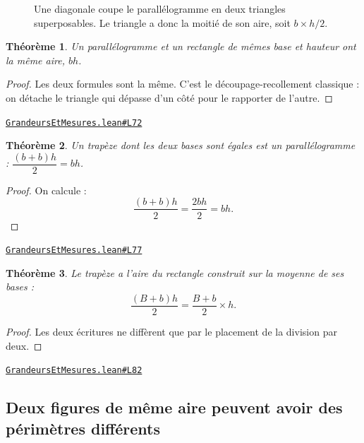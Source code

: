\documentclass[11pt,a4paper]{article}
\theoremstyle{definition}
\theoremstyle{plain}
\newtheorem{theoreme}{Théorème}
\newcommand{\source}[2]{\par\smallskip\noindent\hfill{\footnotesize\href{#1}{\texttt{#2}}}\par\smallskip}
\begin{document}
\begin{figure}[h]
\centering

\caption{Une diagonale coupe le parallélogramme en deux triangles superposables. Le triangle a donc la moitié de son aire, soit $b \times h / 2$.}
\end{figure}

\begin{theoreme}
Un parallélogramme et un rectangle de mêmes base et hauteur ont la même aire, $bh$.
\end{theoreme}

\begin{proof}
Les deux formules sont la même. C'est le découpage-recollement classique : on détache le
triangle qui dépasse d'un côté pour le rapporter de l'autre.
\end{proof}
\source{https://github.com/Commutator-IO/learn-lean/blob/main/courses/01-college/04-grandeurs-et-mesures/GrandeursEtMesures.lean\#L72}{GrandeursEtMesures.lean\#L72}

\begin{theoreme}
Un trapèze dont les deux bases sont égales est un parallélogramme :
$\dfrac{(b + b)h}{2} = bh$.
\end{theoreme}

\begin{proof}
On calcule :
\[ \frac{(b+b)h}{2} = \frac{2bh}{2} = bh . \]
\end{proof}
\source{https://github.com/Commutator-IO/learn-lean/blob/main/courses/01-college/04-grandeurs-et-mesures/GrandeursEtMesures.lean\#L77}{GrandeursEtMesures.lean\#L77}

\begin{theoreme}
Le trapèze a l'aire du rectangle construit sur la moyenne de ses bases :
\[ \frac{(B + b)h}{2} = \frac{B + b}{2} \times h . \]
\end{theoreme}

\begin{proof}
Les deux écritures ne diffèrent que par le placement de la division par deux.
\end{proof}
\source{https://github.com/Commutator-IO/learn-lean/blob/main/courses/01-college/04-grandeurs-et-mesures/GrandeursEtMesures.lean\#L82}{GrandeursEtMesures.lean\#L82}

\subsection{Deux figures de même aire peuvent avoir des périmètres différents}
\end{document}
